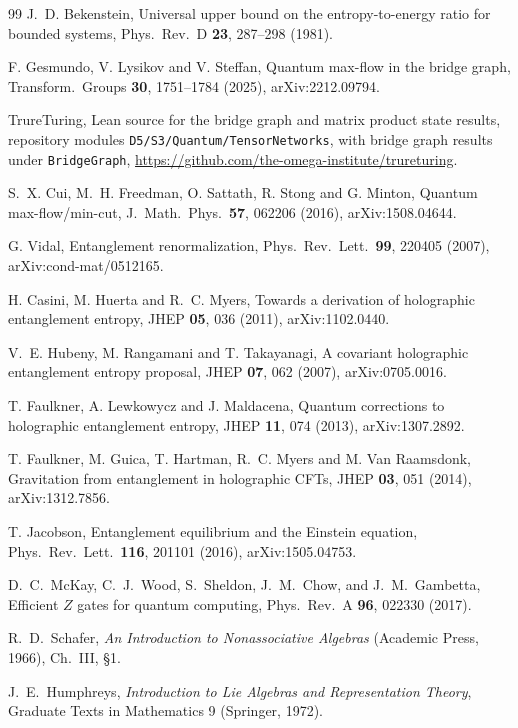 \documentclass[aps,pra,onecolumn,superscriptaddress,nofootinbib,10pt]{revtex4-2}
\theoremstyle{definition}
\theoremstyle{remark}
\begin{document}
\begin{thebibliography}{99}
 J.~D. Bekenstein, Universal upper bound on the entropy-to-energy ratio for bounded systems, Phys.\ Rev.\ D \textbf{23}, 287--298 (1981).

 F. Gesmundo, V. Lysikov and V. Steffan, Quantum max-flow in the bridge graph, Transform.\ Groups \textbf{30}, 1751--1784 (2025), arXiv:2212.09794.

 TrureTuring, Lean source for the bridge graph and matrix product state results, repository modules \texttt{D5/S3/Quantum/TensorNetworks}, with bridge graph results under \texttt{BridgeGraph}, \url{https://github.com/the-omega-institute/trureturing}.

 S.~X. Cui, M.~H. Freedman, O. Sattath, R. Stong and G. Minton, Quantum max-flow/min-cut, J.\ Math.\ Phys.\ \textbf{57}, 062206 (2016), arXiv:1508.04644.

 G. Vidal, Entanglement renormalization, Phys.\ Rev.\ Lett.\ \textbf{99}, 220405 (2007), arXiv:cond-mat/0512165.

 H. Casini, M. Huerta and R.~C. Myers, Towards a derivation of holographic entanglement entropy, JHEP \textbf{05}, 036 (2011), arXiv:1102.0440.

 V.~E. Hubeny, M. Rangamani and T. Takayanagi, A covariant holographic entanglement entropy proposal, JHEP \textbf{07}, 062 (2007), arXiv:0705.0016.

 T. Faulkner, A. Lewkowycz and J. Maldacena, Quantum corrections to holographic entanglement entropy, JHEP \textbf{11}, 074 (2013), arXiv:1307.2892.

 T. Faulkner, M. Guica, T. Hartman, R.~C. Myers and M. Van Raamsdonk, Gravitation from entanglement in holographic CFTs, JHEP \textbf{03}, 051 (2014), arXiv:1312.7856.

 T. Jacobson, Entanglement equilibrium and the Einstein equation, Phys.\ Rev.\ Lett.\ \textbf{116}, 201101 (2016), arXiv:1505.04753.

 D.~C.~McKay, C.~J.~Wood, S.~Sheldon, J.~M.~Chow, and J.~M.~Gambetta, Efficient $Z$ gates for quantum computing, Phys.\ Rev.\ A \textbf{96}, 022330 (2017).

 R.~D.~Schafer, \emph{An Introduction to Nonassociative Algebras} (Academic Press, 1966), Ch.~III, \S1.

 J.~E.~Humphreys, \emph{Introduction to Lie Algebras and Representation Theory}, Graduate Texts in Mathematics 9 (Springer, 1972).


\end{thebibliography}
\end{document}
